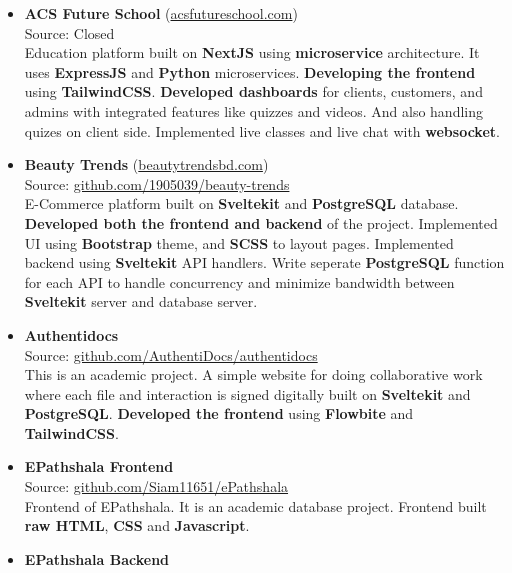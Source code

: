 
\begin{itemize}
  \item {
    \textbf{ACS Future School} (\href{https://www.acsfutureschool.com}{acsfutureschool.com}) \\
    Source: Closed \\
    Education platform built on \textbf{NextJS} using \textbf{microservice} architecture. It uses \textbf{ExpressJS} and \textbf{Python} microservices. \textbf{Developing the frontend} using \textbf{TailwindCSS}. \textbf{Developed dashboards} for clients, customers, and admins with integrated features like quizzes and videos. And also handling quizes on client side. Implemented live classes and live chat with \textbf{websocket}.
  }
  \item {
    \textbf{Beauty Trends} (\href{https://www.beautytrendsbd.com}{beautytrendsbd.com}) \\
    Source: \href{https://github.com/1905039/beauty-trends}{github.com/1905039/beauty-trends} \\
    E-Commerce platform built on \textbf{Sveltekit} and \textbf{PostgreSQL} database. \textbf{Developed both the frontend and backend} of the project. Implemented UI using \textbf{Bootstrap} theme, and \textbf{SCSS} to layout pages. Implemented backend using \textbf{Sveltekit} API handlers. Write seperate \textbf{PostgreSQL} function for each API to handle concurrency and minimize bandwidth between \textbf{Sveltekit} server and database server.
  }
  \item {
      \textbf{Authentidocs} \\
      Source: \href{https://github.com/AuthentiDocs/authentidocs}{github.com/AuthentiDocs/authentidocs} \\
      This is an academic project. A simple website for doing collaborative work where each file and interaction is signed digitally built on \textbf{Sveltekit} and \textbf{PostgreSQL}. \textbf{Developed the frontend} using \textbf{Flowbite} and \textbf{TailwindCSS}.
    }
  \item {
    \textbf{EPathshala Frontend} \\
    Source: \href{https://github.com/Siam11651/ePathshala}{github.com/Siam11651/ePathshala} \\
    Frontend of EPathshala. It is an academic database project. Frontend built \textbf{raw HTML}, \textbf{CSS} and \textbf{Javascript}.
  }
  \item {
    \textbf{EPathshala Backend} \\
}
\end{itemize}
